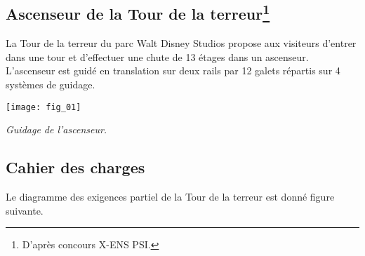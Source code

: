 \ifprof
\begin{multicols}{2}
\else
\begin{multicols}{2}
\fi


 \ifprof
 \else
 
\subsection*{Ascenseur de la Tour de la terreur\footnote{D'après concours X-ENS PSI.}}%

La Tour de la terreur du parc Walt Disney Studios propose aux visiteurs d'entrer dans une tour et d'effectuer une chute de 13 étages dans un ascenseur.
L'ascenseur est guidé en translation sur deux rails par 12 galets répartis sur 4 systèmes de guidage.

\begin{center}
\texttt{[image: fig\_01]}

\textit{Guidage de l'ascenseur.}
\end{center}

%
%


\subsection*{Cahier des charges\\}

Le diagramme des exigences partiel de la Tour de la terreur est donné figure suivante.



\end{multicols}
\end{multicols}
